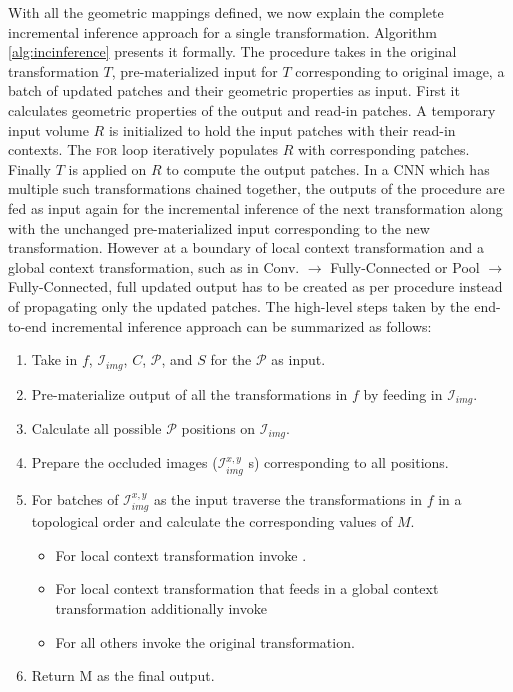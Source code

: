 With all the geometric mappings defined, we now explain the complete incremental inference approach for a single transformation. Algorithm \ref{alg:incinference} presents it formally.
The  procedure takes in the original transformation $T$, pre-materialized input for $T$ corresponding to original image, a batch of updated patches and their geometric properties as input.
First it calculates geometric properties of the output and read-in patches.
A temporary input volume $R$ is initialized to hold the input patches with their read-in contexts.
The \textsc{for} loop iteratively populates $R$ with corresponding patches.
Finally $T$ is applied on $R$ to compute the output patches.
In a CNN which has multiple such transformations chained together, the outputs of the  procedure are fed as input again for the incremental inference of the next transformation along with the unchanged pre-materialized input corresponding to the new transformation.
However at a boundary of local context transformation and a global context transformation, such as in Conv. $\rightarrow$ Fully-Connected or Pool $\rightarrow$ Fully-Connected, full updated output has to be created as per  procedure instead of propagating only the updated patches.
The high-level steps taken by the end-to-end incremental inference approach can be summarized as follows:

\begin{enumerate}
	\item Take in $f$, $\mathcal{I}_{img}$, $C$, $\mathcal{P}$, and $S$ for the $\mathcal{P}$ as input.
	\item Pre-materialize output of all the transformations in $f$ by feeding in $\mathcal{I}_{img}$.
	\item Calculate all possible $\mathcal{P}$ positions on $\mathcal{I}_{img}$.
	\item Prepare the occluded images ($\mathcal{I}^{x,y}_{img}$ s) corresponding to all positions.
	\item For batches of $\mathcal{I}^{x,y}_{img}$ as the input traverse the transformations in $f$ in a topological order and calculate the corresponding values of $M$.
	\begin{itemize}
		\item For local context transformation invoke .
		\item For local context transformation that feeds in a global context transformation additionally invoke 
		\item For all others invoke the original transformation.
	\end{itemize}
	\item Return M as the final output.
\end{enumerate}


